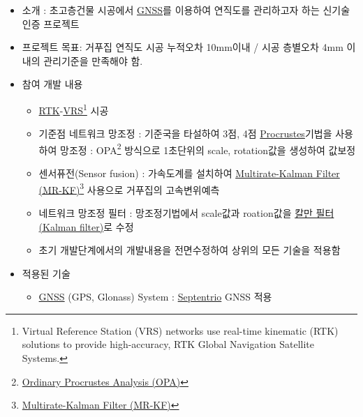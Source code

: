 \documentclass[10pt,a4paper,ragged2e]{altacv}
\begin{document}
\clearpage
\begin{fullwidth}


	\begin{itemize}
		\item 소개 : 초고층건물 시공에서 \href{http://gnss.ngii.go.kr/info/summary}{GNSS}를 이용하여 연직도를 관리하고자 하는 신기술 인증 프로젝트
		\item 프로젝트 목표: 거푸집 연직도 시공 누적오차 10mm이내 / 시공 층별오차 4mm 이내의 관리기준을 만족해야 함.
		\item 참여 개발 내용
		      \begin{itemize}
			      \item \href{https://en.wikipedia.org/wiki/Real_Time_Kinematic}{RTK}-\href{https://en.wikipedia.org/wiki/Virtual_Reference_Station}{VRS}\footnote{Virtual Reference Station (VRS) networks use real-time kinematic (RTK) solutions to provide high-accuracy, RTK Global Navigation Satellite Systems.} 시공
			      \item 기준점 네트워크 망조정 : 기준국을 타설하여 3점, 4점 \href{https://en.wikipedia.org/wiki/Procrustes_analysis}{Procrustes}기법을 사용하여 망조정 : OPA\footnote{\href{https://en.wikipedia.org/wiki/Procrustes_analysis}{Ordinary Procrustes Analysis (OPA)}} 방식으로 1초단위의 scale, rotation값을 생성하여 값보정
			      \item 센서퓨전(Sensor fusion) : 가속도계를 설치하여 \href{http://scholar.lib.vt.edu/theses/available/etd-062899-064821/unrestricted/etd.PDF}{Multirate-Kalman Filter (MR-KF)}\footnote{\href{http://scholar.lib.vt.edu/theses/available/etd-062899-064821/unrestricted/etd.PDF}{Multirate-Kalman Filter (MR-KF)}} 사용으로 거푸집의 고속변위예측
			      \item 네트워크 망조정 필터 : 망조정기법에서 scale값과 roation값을 \href{https://ko.wikipedia.org/wiki/\%EC\%B9\%BC\%EB\%A7\%8C_\%ED\%95\%84\%ED\%84\%B0}{칼만 필터(Kalman filter)}로 수정
			      \item 초기 개발단계에서의 개발내용을 전면수정하여 상위의 모든 기술을 적용함
		      \end{itemize}
		\item 적용된 기술
		      \begin{itemize}
			      \item \href{http://gnss.ngii.go.kr/info/summary}{GNSS} (GPS, Glonass) System : \href{http://www.septentrio.com/}{Septentrio} GNSS 적용

\end{itemize}
\end{itemize}
\end{fullwidth}
\end{document}

